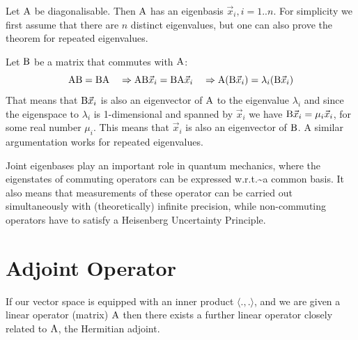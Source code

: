 \documentclass[
  a4paper,
  DIV=11,
  numbers=noendperiod,
  oneside]{scrreprt}
\theoremstyle{definition}
\theoremstyle{remark}
\newenvironment{fbx}[3]{\begin{tcolorbox}[enhanced, breakable,%
attach boxed title to top*={xshift=1.4pt},
boxed title style={boxrule=0.0mm, fuzzy shadow={1pt}{-1pt}{0mm}{0.1mm}{gray}, arc=.3em, rounded corners=east, sharp corners=west}, colframe=#1-color2, colbacktitle=#1-color1, colback = white, coltitle=black,  titlerule=0mm, toprule=0pt, bottomrule=.7pt, leftrule=.3em, rightrule=0pt, outer arc=.3em,  arc=0pt,	 sharp corners = east, left=.5em, bottomtitle=1mm, toptitle=1mm,title=\textbf{#2}\hspace{0.5em}{#3}]}
{\end{tcolorbox}}
\begin{document}
\label{Proofux2a-5.12}
\begin{fbx}{Proof}{Proof}{}
\label{Proof*-5.12}
Let \({\rm A}\) be diagonalisable. Then \({\rm A}\) has an eigenbasis
\(\vec{x}_i, i=1..n\). For simplicity we first assume that there are
\(n\) distinct eigenvalues, but one can also prove the theorem for
repeated eigenvalues.

Let \({\rm B}\) be a matrix that commutes with \({\rm A}\):\\
\[ {\rm A B = B A} \quad \Rightarrow {\rm A B}\vec{x}_i ={\rm B A}\vec{x}_i \quad \Rightarrow {\rm A}({\rm  B}\vec{x}_i) = \lambda_i ({\rm B} \vec{x}_i)  \]
That means that \({\rm B} \vec{x}_i\) is also an eigenvector of
\({\rm A}\) to the eigenvalue \(\lambda_i\) and since the eigenspace to
\(\lambda_i\) is 1-dimensional and spanned by \(\vec{x}_i\) we have
\({\rm B} \vec{x}_i = \mu_i \vec{x}_i\), for some real number \(\mu_i\).
This means that \(\vec{x}_i\) is also an eigenvector of \({\rm B}\). A
similar argumentation works for repeated eigenvalues.

\end{fbx}

\begin{tcolorbox}[enhanced jigsaw, opacitybacktitle=0.6, left=2mm, breakable, bottomrule=.15mm, colbacktitle=quarto-callout-note-color!10!white, leftrule=.75mm, titlerule=0mm, rightrule=.15mm, toprule=.15mm, colback=white, toptitle=1mm, colframe=quarto-callout-note-color-frame, coltitle=black, bottomtitle=1mm, title=\textcolor{quarto-callout-note-color}{\faInfo}\hspace{0.5em}{Remark}, opacityback=0, arc=.35mm]

Joint eigenbases play an important role in quantum mechanics, where the
eigenstates of commuting operators can be expressed
w.r.t.\textasciitilde a common basis. It also means that measurements of
these operator can be carried out simultaneously with (theoretically)
infinite precision, while non-commuting operators have to satisfy a
Heisenberg Uncertainty Principle.

\end{tcolorbox}

\section{Adjoint Operator}\label{adjoint-operator}

If our vector space is equipped with an inner product
\(\langle . , . \rangle\), and we are given a linear operator (matrix)
\({\rm A}\) then there exists a further linear operator closely related
to \({\rm A}\), the Hermitian adjoint.
\end{document}
